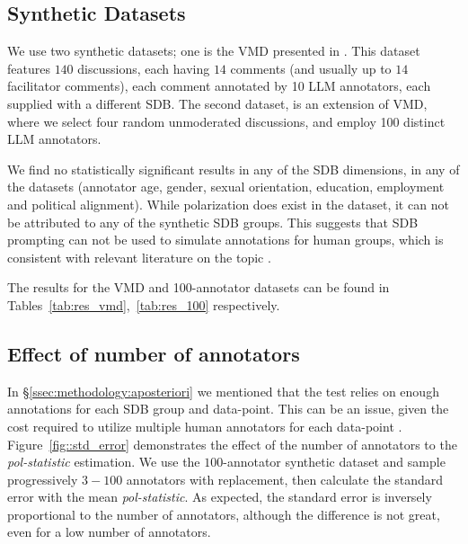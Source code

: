 \documentclass{article}
\begin{document}




\subsection{Synthetic Datasets}

We use two synthetic datasets; one is the \ac{VMD} presented in \textcite{tsirmpas2025scalableevaluationonlinefacilitation}. This dataset features $140$ discussions, each having $14$ comments (and usually up to $14$ facilitator comments), each comment annotated by 10 \ac{LLM} annotators, each supplied with a different \ac{SDB}. The second dataset, is an extension of \ac{VMD}, where we select four random unmoderated discussions, and employ 100 distinct \ac{LLM} annotators.

We find no statistically significant results in any of the \ac{SDB} dimensions, in any of the datasets (annotator age, gender, sexual orientation, education, employment and political alignment). While polarization does exist in the dataset, %
it can not be attributed to any of the synthetic \ac{SDB} groups. This suggests that \ac{SDB} prompting can not be used to simulate annotations for human groups, which is consistent with relevant literature on the topic \parencite{anthis_2025,hewitt2024predicting,rossi_2024,jansen_2023,bisbee_2023,neumann_2025}.

The results for the \ac{VMD} and 100-annotator datasets can be found in Tables~\ref{tab:res_vmd},~\ref{tab:res_100} respectively.





\subsection{Effect of number of annotators}
\label{ssec: results:num_annotators}

In \S\ref{ssec:methodology:aposteriori} we mentioned that the test relies on enough annotations for each \ac{SDB} group and data-point. This can be an issue, given the cost required to utilize multiple human annotators for each data-point \parencite{rossi_2024}. Figure~\ref{fig::std_error} demonstrates the effect of the number of annotators to the \textit{pol-statistic} estimation. We use the $100$-annotator synthetic dataset and sample progressively $3-100$ annotators with replacement, then calculate the standard error with the mean \textit{pol-statistic}. As expected, the standard error is inversely proportional to the number of annotators, although the difference is not great, even for a low number of annotators.
\end{document}
